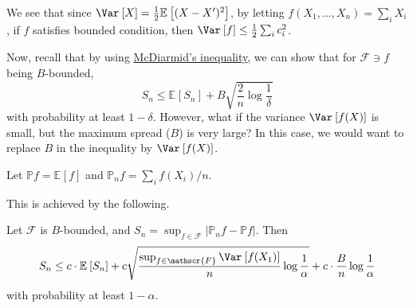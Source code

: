 \begin{note}
	We see that since \(\Var_{}\left[X \right] = \frac{1}{2}\mathbb{E}_{}\left[(X-X^{\prime} )^2 \right]\), by letting \(f(X_1, \dots , X_n) = \sum_{i} X_i\), if \(f\) satisfies bounded condition, then \(\Var_{}\left[f \right] \leq \frac{1}{2}\sum_{i} c_i^2\).
\end{note}

Now, recall that by using \hyperref[thm:McDiarmid-inequality]{McDiarmid's inequality}, we can show that for \(\mathscr{F} \ni f\) being \(B\)-bounded,
\[
	S_n \leq \mathbb{E}_{}\left[S_n \right] + B \sqrt{\frac{2}{n}\log \frac{1}{\delta }}
\]
with probability at least \(1 - \delta \). However, what if the variance \(\Var_{}\left[f(X) \right] \) is small, but the maximum spread (\(B\)) is very large? In this case, we would want to replace \(B\) in the inequality by \(\Var_{}\left[f(X) \right] \).

\begin{notation}
	Let \(\mathbb{P} f = \mathbb{E}_{}\left[f \right] \) and \(\mathbb{P} _n f = \sum_{i} f(X_i) / n\).
\end{notation}

This is achieved by the following.

\begin{theorem}\label{thm:Talagrand-concentration-inequality}
	Let \(\mathscr{F} \) is \(B\)-bounded, and \(S_n = \sup _{f\in \mathscr{F}} \vert \mathbb{P} _n f - \mathbb{P} f \vert \). Then
	\[
		S_n \leq c\cdot \mathbb{E}_{}\left[S_n \right] + c \sqrt{\frac{\sup_{f\in \mathscr{F}} \Var_{}\left[f(X_1) \right] }{n} \log \frac{1}{\alpha }} + c\cdot \frac{B}{n} \log \frac{1}{\alpha }
	\]
	with probability at least \(1 - \alpha \).
\end{theorem}
